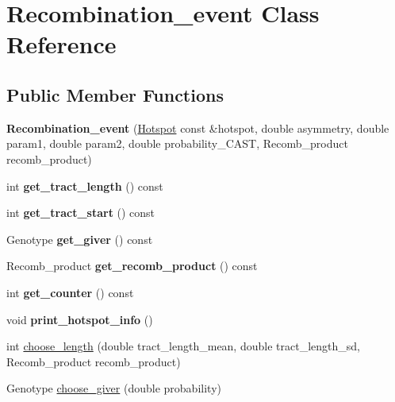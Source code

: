 \hypertarget{class_recombination__event}{}\section{Recombination\+\_\+event Class Reference}
\label{class_recombination__event}
\subsection*{Public Member Functions}
\begin{DoxyCompactItemize}
\item 
\mbox{\label{class_recombination__event_aff04a25d5b7907793b1239e68ca72669}} 
{\bfseries Recombination\+\_\+event} (\mbox{\hyperlink{class_hotspot}{Hotspot}} const \&hotspot, double asymmetry, double param1, double param2, double probability\+\_\+\+C\+A\+ST, Recomb\+\_\+product recomb\+\_\+product)
\item 
\mbox{\label{class_recombination__event_a6762f4cf6e4af6feae93024863608fc6}} 
int {\bfseries get\+\_\+tract\+\_\+length} () const
\item 
\mbox{\label{class_recombination__event_a2ff116f519448989cb86ab3bca3cf8a8}} 
int {\bfseries get\+\_\+tract\+\_\+start} () const
\item 
\mbox{\label{class_recombination__event_ac34f5d0e4e413cee6bc322c5a08e8f76}} 
Genotype {\bfseries get\+\_\+giver} () const
\item 
\mbox{\label{class_recombination__event_ae1d9eae03c24c1f42d8f5b2b4cce0960}} 
Recomb\+\_\+product {\bfseries get\+\_\+recomb\+\_\+product} () const
\item 
\mbox{\label{class_recombination__event_a8dd08f09715314c0464c8957c91a397d}} 
int {\bfseries get\+\_\+counter} () const
\item 
\mbox{\label{class_recombination__event_a7e9e4ee1205ba8b7617f678e512e852e}} 
void {\bfseries print\+\_\+hotspot\+\_\+info} ()
\item 
int \mbox{\hyperlink{class_recombination__event_a1e2144e6c77309681613068b418ec949}{choose\+\_\+length}} (double tract\+\_\+length\+\_\+mean, double tract\+\_\+length\+\_\+sd, Recomb\+\_\+product recomb\+\_\+product)
\item 
Genotype \mbox{\hyperlink{class_recombination__event_a452bf9940c36aaf1063ffc62a06b055f}{choose\+\_\+giver}} (double probability)
\end{DoxyCompactItemize}
